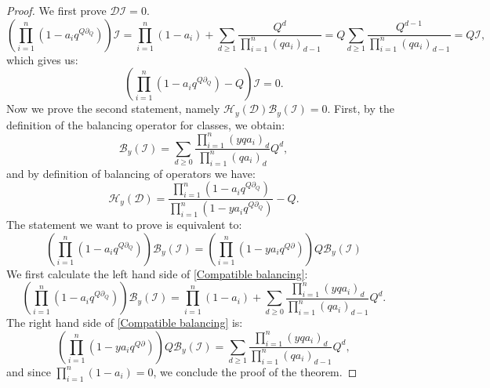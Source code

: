 \documentclass{amsart}
\begin{document}
\begin{proof}
    We first prove $\mathcal{D} \mathcal{I} = 0$. 
    \[
    \left(\prod_{i=1}^n (1-a_iq^{Q\partial _Q})\right)\mathcal{I} = \prod_{i=1}^n(1-a_i) + \sum_{d \geq 1}\frac{Q^d}{\prod_{i=1}^{n}(qa_i)_{d-1}} = Q\sum_{d \geq 1}\frac{Q^{d-1}}{\prod_{i=1}^{n}(qa_i)_{d-1}} = Q\mathcal{I},
    \]
    which gives us:
    \[
    \left(\prod_{i=1}^n (1-a_iq^{Q\partial _Q})-Q\right)\mathcal{I}=0. 
    \]
    Now we prove the second statement, namely $\mathcal{H}_y(\mathcal{D}) \mathcal{B}_y(\mathcal{I})=0$.
 First, by the definition of the balancing operator for classes, we obtain:
 \[
 \mathcal{B}_y(\mathcal{I}) = \sum_{d \geq 0}\frac{\prod_{i=1}^n(yqa_i)_d}{\prod_{i=1}^n(qa_i)_d}Q^d,
 \]
and by definition of balancing of operators we have:
\[
\mathcal{H}_y(\mathcal{D}) =\frac{\prod_{i=1}^n (1-a_iq^{Q\partial _Q})}{\prod_{i=1}^n(1-ya_iq^{Q\partial _Q})}-Q.
\]
The statement we want to prove is equivalent to:
\begin{equation}\label{Compatible balancing}
\left(\prod_{i=1}^n (1-a_iq^{Q\partial _Q})\right)\mathcal{B}_y(\mathcal{I}) = \left(\prod_{i=1}^n (1-ya_iq^{Q\partial})\right) Q\mathcal{B}_y(\mathcal{I})
\end{equation}
We first calculate the left hand side of \eqref{Compatible balancing}:
\[
\left(\prod_{i=1}^n (1-a_iq^{Q\partial _Q})\right)\mathcal{B}_y(\mathcal{I}) = \prod_{i=1}^n(1-a_i) + \sum_{d \geq 0}\frac{\prod_{i=1}^n(yqa_i)_d}{\prod_{i=1}^n(qa_i)_{d-1}}Q^d.
\]
The right hand side of \eqref{Compatible balancing} is:
\[
\left(\prod_{i=1}^n (1-ya_iq^{Q\partial})\right) Q\mathcal{B}_y(\mathcal{I}) = \sum_{d \geq 1}\frac{\prod_{i=1}^n(yqa_i)_d}{\prod_{i=1}^n(qa_i)_{d-1}}Q^d,
\]
and since $\prod_{i=1}^n(1-a_i) = 0$, we conclude the proof of the theorem.
\end{proof}
\end{document}
